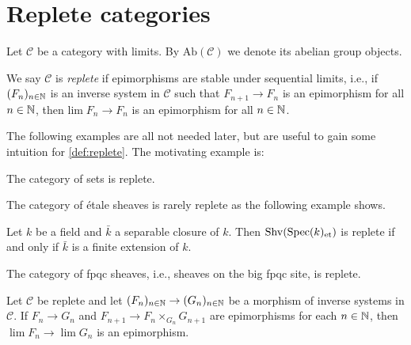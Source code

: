 \chapter{Replete categories}

Let $\mathcal{C}$ be a category with limits. By
$\mathrm{Ab}(\mathcal{C})$ we denote its abelian group objects.

\begin{definition}
    We say $\mathcal{C}$ is \emph{replete} if epimorphisms are stable under sequential limits, i.e.,
    if $(F_n)_{n \in \mathbb{N}}$ is an inverse system in $\mathcal{C}$ such that
    $F_{n+1} \to F_n$ is an epimorphism for all $n \in \mathbb{N}$, then $\mathrm{lim}\; F_n \to F_n$ is
    an epimorphism for all $n \in \mathbb{N}$.
    \label{def:replete}
\end{definition}

The following examples are all not needed later, but are useful to gain some intuition for
\ref{def:replete}. The motivating example is:

\begin{example}
    The category of sets is replete.
    \label{ex:replete-sets}
\end{example}

The category of étale sheaves is rarely replete as the following example shows.

\begin{example}
    Let $k$ be a field and $\bar k$ a separable closure of $k$. Then $\mathrm{Shv}(\mathrm{Spec}(k)_{\mathrm{et}})$ is replete
    if and only if $\bar k$ is a finite extension of $k$.
    \label{ex:replete-etale-site}
\end{example}

\begin{example}
    The category of fpqc sheaves, i.e., sheaves on the big fpqc site, is replete.
    \label{ex:replete-fpqc-site}
\end{example}

\begin{lemma}
    Let $\mathcal{C}$ be replete and let $(F_n)_{n \in \mathbb{N}} \to (G_n)_{n \in \mathbb{N}}$ be a morphism
    of inverse systems in $\mathcal{C}$. If
    $F_n \to G_n$ and $F_{n+1} \to F_{n} \times_{G_n} G_{n+1}$ are epimorphisms for each $n \in \mathbb{N}$, then
    $\lim F_n \to \lim G_n$ is an epimorphism.
    \label{lemma:replete-lim-lim-epi}
\end{lemma}

